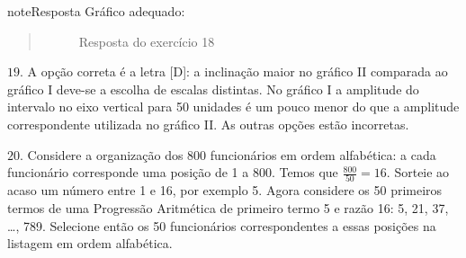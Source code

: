 \begin{sphinxadmonition}{note}{Resposta}
Gráfico adequado:
\label{\detokenize{PE103-E:id15}}\begin{quote}

\begin{figure}[H]
\centering
\capstart

\noindent{}
\caption{Resposta do exercício 18}\label{\detokenize{PE103-E:id32}}\end{figure}
\end{quote}

\(19.\) A opção correta é a letra {[}D{]}: a inclinação maior no gráfico II comparada ao gráfico I deve-se a escolha de escalas distintas. No gráfico I a amplitude do intervalo no eixo vertical para 50 unidades é um pouco menor do que a amplitude correspondente utilizada no gráfico II. As outras opções estão incorretas.

\(20.\) Considere a organização dos 800 funcionários em ordem alfabética: a cada funcionário corresponde uma posição de 1 a 800. Temos que \(\frac{800}{50}=16\). Sorteie ao acaso um número entre 1 e 16, por exemplo 5. Agora considere os 50 primeiros termos de uma Progressão Aritmética de primeiro termo 5 e razão 16: 5, 21, 37, …, 789. Selecione então os 50 funcionários correspondentes a essas posições na listagem em ordem alfabética.
\end{sphinxadmonition}


